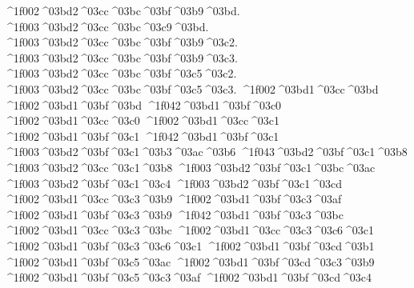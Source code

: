 {	^^^^1f002^^^^03bd2^^^^03cc^^^^03bc^^^^03bf^^^^03b9^^^^03bd.
	^^^^1f003^^^^03bd2^^^^03cc^^^^03bc^^^^03c9^^^^03bd.
	^^^^1f003^^^^03bd2^^^^03cc^^^^03bc^^^^03bf^^^^03b9^^^^03c2.
	^^^^1f003^^^^03bd2^^^^03cc^^^^03bc^^^^03bf^^^^03b9^^^^03c3.
	^^^^1f003^^^^03bd2^^^^03cc^^^^03bc^^^^03bf^^^^03c5^^^^03c2.
	^^^^1f003^^^^03bd2^^^^03cc^^^^03bc^^^^03bf^^^^03c5^^^^03c3.
^^^^1f002^^^^03bd1^^^^03cc^^^^03bd 		%
^^^^1f002^^^^03bd1^^^^03bf^^^^03bd
^^^^1f042^^^^03bd1^^^^03bf^^^^03c0  		%
^^^^1f002^^^^03bd1^^^^03cc^^^^03c0
^^^^1f002^^^^03bd1^^^^03cc^^^^03c1     		%
^^^^1f002^^^^03bd1^^^^03bf^^^^03c1
^^^^1f042^^^^03bd1^^^^03bf^^^^03c1     		%
	^^^^1f003^^^^03bd2^^^^03bf^^^^03c1^^^^03b3^^^^03ac^^^^03b6 		%
	^^^^1f043^^^^03bd2^^^^03bf^^^^03c1^^^^03b8   		%
	^^^^1f003^^^^03bd2^^^^03cc^^^^03c1^^^^03b8
	^^^^1f003^^^^03bd2^^^^03bf^^^^03c1^^^^03bc^^^^03ac  		%
	^^^^1f003^^^^03bd2^^^^03bf^^^^03c1^^^^03c4    		%
	^^^^1f003^^^^03bd2^^^^03bf^^^^03c1^^^^03cd   		%
^^^^1f002^^^^03bd1^^^^03cc^^^^03c3^^^^03b9 		%
^^^^1f002^^^^03bd1^^^^03bf^^^^03c3^^^^03af
^^^^1f002^^^^03bd1^^^^03bf^^^^03c3^^^^03b9  		%
^^^^1f042^^^^03bd1^^^^03bf^^^^03c3^^^^03bc 		%
^^^^1f002^^^^03bd1^^^^03cc^^^^03c3^^^^03bc
^^^^1f002^^^^03bd1^^^^03cc^^^^03c3^^^^03c6^^^^03c1 		%
^^^^1f002^^^^03bd1^^^^03bf^^^^03c3^^^^03c6^^^^03c1
^^^^1f002^^^^03bd1^^^^03bf^^^^03cd^^^^03b1  		%
^^^^1f002^^^^03bd1^^^^03bf^^^^03c5^^^^03ac
^^^^1f002^^^^03bd1^^^^03bf^^^^03cd^^^^03c3^^^^03b9 		%
^^^^1f002^^^^03bd1^^^^03bf^^^^03c5^^^^03c3^^^^03af
^^^^1f002^^^^03bd1^^^^03bf^^^^03cd^^^^03c4  		%
}
